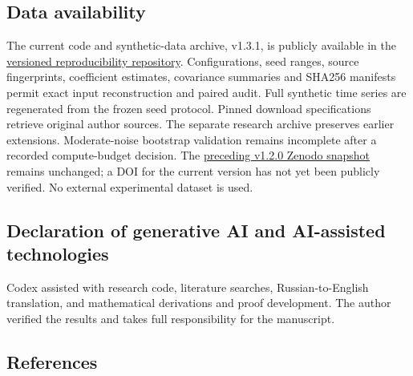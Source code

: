 \documentclass[
  american,
  11pt,
]{article}
\begin{document}
\subsection{Data availability}\label{data-availability}

The current code and synthetic-data archive, v1.3.1, is publicly
available in the
\href{https://github.com/malyshevdanil/wsindy-information-limits/tree/v1.3.1}{versioned
reproducibility repository}. Configurations, seed ranges, source
fingerprints, coefficient estimates, covariance summaries and SHA256
manifests permit exact input reconstruction and paired audit. Full
synthetic time series are regenerated from the frozen seed protocol.
Pinned download specifications retrieve original author sources. The
separate research archive preserves earlier extensions. Moderate-noise
bootstrap validation remains incomplete after a recorded compute-budget
decision. The \href{https://doi.org/10.5281/zenodo.23313935}{preceding
v1.2.0 Zenodo snapshot} remains unchanged; a DOI for the current version
has not yet been publicly verified. No external experimental dataset is
used.

\subsection{Declaration of generative AI and AI-assisted
technologies}\label{declaration-of-generative-ai-and-ai-assisted-technologies}

Codex assisted with research code, literature searches,
Russian-to-English translation, and mathematical derivations and proof
development. The author verified the results and takes full
responsibility for the manuscript.

\subsection*{References}\label{references}
\end{document}
